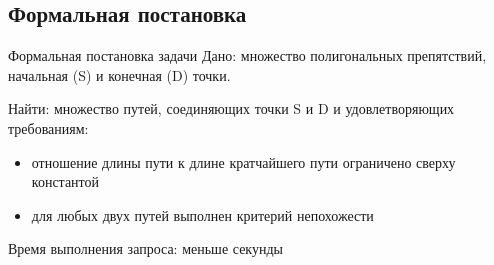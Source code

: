 \documentclass[russian, hyperref={unicode}]{beamer}
\begin{document}
\subsection{Формальная постановка}

\begin{frame}{Формальная постановка задачи}
    Дано: множество полигональных препятствий, начальная (S) и конечная (D) точки.

    Найти: множество путей, соединяющих точки S и D и удовлетворяющих требованиям:
    \begin{itemize}
        \item отношение длины пути к длине кратчайшего пути
          ограничено сверху константой
        \item для любых двух путей выполнен критерий непохожести
    \end{itemize}

    Время выполнения запроса: меньше секунды
\end{frame}
\end{document}

